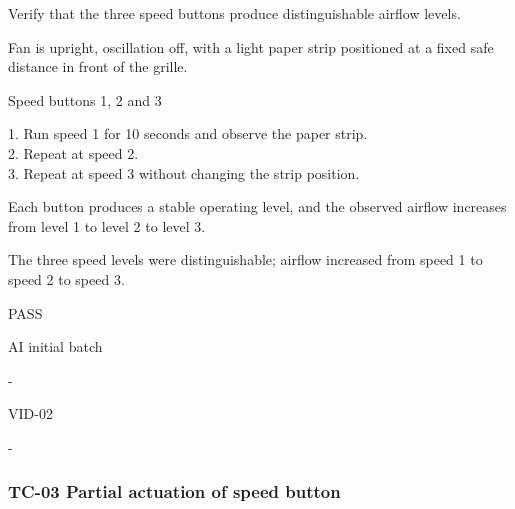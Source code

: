 \begin{description}[style=nextline,leftmargin=3.2cm]

\item[Objective] Verify that the three speed buttons produce distinguishable airflow levels.

\item[Preconditions] Fan is upright, oscillation off, with a light paper strip positioned at a fixed safe distance in front of the grille.

\item[Input] Speed buttons 1, 2 and 3

\item[Steps] 1. Run speed 1 for 10 seconds and observe the paper strip.\\ 2. Repeat at speed 2.\\ 3. Repeat at speed 3 without changing the strip position.

\item[Expected] Each button produces a stable operating level, and the observed airflow increases from level 1 to level 2 to level 3.

\item[Actual] The three speed levels were distinguishable; airflow increased from speed 1 to speed 2 to speed 3.

\item[Verdict] PASS

\item[Source] AI initial batch

\item[Edge case] -

\item[Video] VID-02

\item[Issue] -

\end{description}

\clearpage

\subsubsection{TC-03 Partial actuation of speed button}

